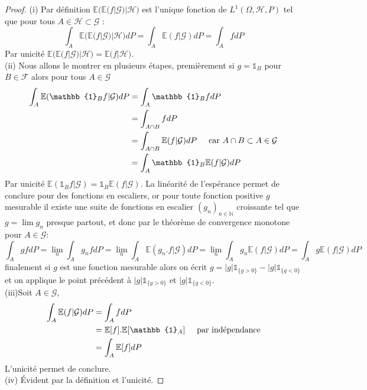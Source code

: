 \documentclass[12pt]{article}
\theoremstyle{definition}
\begin{document}
\begin{proof}
	(i) Par définition $\mathbb{E}\Big(\mathbb{E}(f|\mathcal{G})|\mathcal{H}\Big)$ est l'unique fonction de $L^1(\Omega,\mathcal{H},P)$ tel que pour tous $A\in\mathcal{H}\subset\mathcal{G}$ :
	\begin{equation*}
		\int_{A}\mathbb{E}\Big(\mathbb{E}(f|\mathcal{G})|\mathcal{H}\Big)dP = \int_{A}\mathbb{E}(f|\mathcal{G})dP= \int_{A}f dP
	\end{equation*}
	Par unicité $\mathbb{E}\Big(\mathbb{E}(f|\mathcal{G})|\mathcal{H}\Big)=\mathbb{E}\Big(f|\mathcal{H}\Big)$.\\
	(ii) Nous allons le montrer en plusieurs étapes, premièrement si $g=\mathbb{1}_{B}$ pour $B\in\mathcal{F}$ alors pour tous $A\in \mathcal{G}$ 
	\begin{align*}
		\int_{A}\mathbb{E}(\mathbb{1}_{B}f|\mathcal{G})dP&=\int_A \mathbb{1}_B f dP\\
		&=\int_{A\cap B} f dP\\
		&=\int_{A\cap B} \mathbb{E}(f|\mathcal{G})dP \hspace{5mm} \text{car $A\cap B \subset A\in\mathcal{G}$}\\
		&=\int_{A} \mathbb{1}_B \mathbb{E}(f|\mathcal{G})dP\\
	\end{align*}
	Par unicité $\mathbb{E}(\mathbb{1}_{B}f|\mathcal{G}) = \mathbb{1}_B \mathbb{E}(f|\mathcal{G})$. La linéarité de l'espérance  permet de conclure pour des fonctions en escaliers, or pour toute fonction positive $g$ mesurable il existe une suite de fonctions en escalier $(g_n)_{n\in\mathbb{N}}$ croissante tel que $g=\lim g_n$ presque partout, et donc par le théorème de convergence monotone pour $A\in\mathcal{G}$:
	\begin{equation*}
		\int_{A}gfdP=\lim_{n}\int_{A}g_nfdP=\lim_{n}\int_{A}\mathbb{E}(g_n.f|\mathcal{G})dP=\lim_{n}\int_{A}g_n\mathbb{E}(f|\mathcal{G}) dP =\int_{A}g\mathbb{E}(f|\mathcal{G})dP
	\end{equation*}
	finalement si $g$ est une fonction mesurable alors on écrit $g = |g|\mathbb{1}_{\big\{g>0\big\}}-|g|\mathbb{1}_{\big\{g<0\big\}}$ et on applique le point précédent à $|g|\mathbb{1}_{\big\{g>0\big\}}$ et $|g|\mathbb{1}_{\big\{g<0\big\}}$.\\
	(iii)Soit $A\in \mathcal{G}$, 
	\begin{align*}
		\int_{A}\mathbb{E}(f|\mathcal{G})dP &= \int_{A}f dP\\
		&=\mathbb{E}[f]. \mathbb{E}[\mathbb{1}_{A}]\hspace{5mm}\text{par indépendance}\\
		&=\int_A \mathbb{E}[f] dP
	\end{align*}
	L'unicité permet de conclure.\\
	(iv)  Évident par la définition et l'unicité.
	\end{proof}
\end{document}
